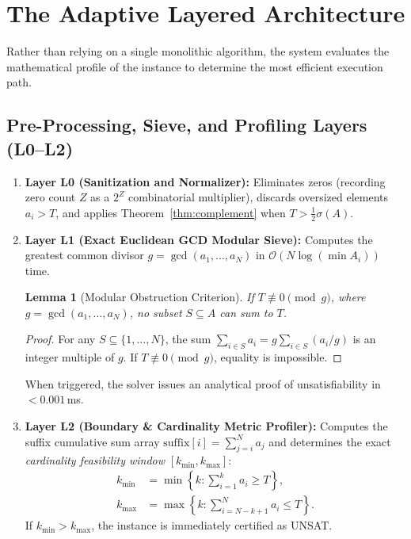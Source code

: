 \documentclass[journal,onecolumn,11pt]{IEEEtran}
\newtheorem{lemma}{Lemma}
\begin{document}
\section{The Adaptive Layered Architecture}
\label{sec:architecture}

Rather than relying on a single monolithic algorithm, the system evaluates the mathematical profile of the instance to determine the most efficient execution path.

\subsection{Pre-Processing, Sieve, and Profiling Layers (L0--L2)}
\begin{enumerate}
    \item \textbf{Layer L0 (Sanitization and Normalizer):} Eliminates zeros (recording zero count $Z$ as a $2^Z$ combinatorial multiplier), discards oversized elements $a_i > T$, and applies Theorem~\ref{thm:complement} when $T > \frac{1}{2}\sigma(A)$.
    
    \item \textbf{Layer L1 (Exact Euclidean GCD Modular Sieve):} Computes the greatest common divisor $g = \gcd(a_1, \dots, a_N)$ in $\mathcal{O}(N \log(\min A_i))$ time. 
    \begin{lemma}[Modular Obstruction Criterion]
    If $T \not\equiv 0 \pmod g$, where $g = \gcd(a_1, \dots, a_N)$, no subset $S \subseteq A$ can sum to $T$.
    \end{lemma}
    \begin{proof}
    For any $S \subseteq \{1, \dots, N\}$, the sum $\sum_{i \in S} a_i = g \sum_{i \in S} (a_i / g)$ is an integer multiple of $g$. If $T \not\equiv 0 \pmod g$, equality is impossible.
    \end{proof}
    When triggered, the solver issues an analytical proof of unsatisfiability in $<0.001$\,ms.
    
    \item \textbf{Layer L2 (Boundary \& Cardinality Metric Profiler):} Computes the suffix cumulative sum array $\text{suffix}[i] = \sum_{j=i}^N a_j$ and determines the exact \textit{cardinality feasibility window} $[k_{\min}, k_{\max}]$:
    \begin{align}
        k_{\min} &= \min \left\{ k : \sum_{i=1}^k a_i \ge T \right\}, \\
        k_{\max} &= \max \left\{ k : \sum_{i=N-k+1}^N a_i \le T \right\}.
    \end{align}
    If $k_{\min} > k_{\max}$, the instance is immediately certified as UNSAT.
\end{enumerate}
\end{document}
